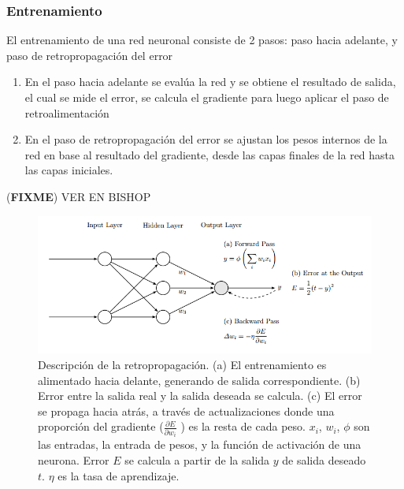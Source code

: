 \documentclass[a4paper,11pt,spanish]{book}
\newcommand*{\FIXME}[1]{{(\textbf{FIXME}) {#1}}}
\begin{document}
	\subsubsection {Entrenamiento}
	  El entrenamiento de una red neuronal consiste de 2 pasos: paso hacia adelante, y paso de retropropagación del error
	  \begin{enumerate}
	    \item En el paso hacia adelante se evalúa la red y se obtiene el resultado de salida, el cual se mide el error, se calcula el gradiente para luego aplicar el paso de retroalimentación
	    \item En el paso de retropropagación del error se ajustan los pesos internos de la red en base al resultado del gradiente, desde las capas finales de la red hasta las capas iniciales.
	  \end{enumerate}
	  \FIXME{VER EN BISHOP}
	  \begin{figure}[H]
	    \begin{center}
	    \includegraphics[width=\linewidth]{./img/backprop.png}
	    \end{center}
	    \caption{ Descripción de la retropropagación. (a) El entrenamiento es alimentado hacia delante, generando de salida correspondiente. (b) Error entre la salida real y la salida deseada
	    se calcula. (c) El error se propaga hacia atrás, a través de actualizaciones donde una proporción del gradiente ($ \frac{\partial E}{\partial w_i}$ ) es la resta de cada peso. $x_i$, $w_i$, $\phi$ son las entradas,
	    la entrada de pesos, y la función de activación de una neurona. Error $E$ se calcula a partir de la salida $y$ de salida deseado $t$. $\eta$ es la tasa de aprendizaje.
	    \cite{Automatic_differentiation_ML} }
	    \label{fig:backprop}
	  \end{figure}
\end{document}
